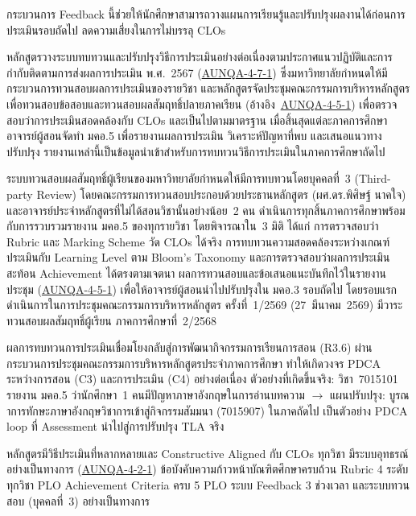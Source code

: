 กระบวนการ Feedback นี้ช่วยให้นักศึกษาสามารถวางแผนการเรียนรู้และปรับปรุงผลงานได้ก่อนการประเมินรอบถัดไป ลดความเสี่ยงในการไม่บรรลุ CLOs


หลักสูตรวางระบบทบทวนและปรับปรุงวิธีการประเมินอย่างต่อเนื่องตามประกาศแนวปฏิบัติและการกำกับติดตามการส่งผลการประเมิน พ.ศ.~2567 (\hyperlink{ref:AUNQA-4-7-1}{AUNQA-4-7-1}) ซึ่งมหาวิทยาลัยกำหนดให้มีกระบวนการทวนสอบผลการประเมินของรายวิชา และหลักสูตรจัดประชุมคณะกรรมการบริหารหลักสูตรเพื่อทวนสอบข้อสอบและทวนสอบผลสัมฤทธิ์ปลายภาคเรียน (อ้างอิง~\hyperlink{ref:AUNQA-4-5-1}{AUNQA-4-5-1}) เพื่อตรวจสอบว่าการประเมินสอดคล้องกับ CLOs และเป็นไปตามมาตรฐาน เมื่อสิ้นสุดแต่ละภาคการศึกษา อาจารย์ผู้สอนจัดทำ มคอ.5 เพื่อรายงานผลการประเมิน วิเคราะห์ปัญหาที่พบ และเสนอแนวทางปรับปรุง รายงานเหล่านี้เป็นข้อมูลนำเข้าสำหรับการทบทวนวิธีการประเมินในภาคการศึกษาถัดไป

ระบบทวนสอบผลสัมฤทธิ์ผู้เรียนของมหาวิทยาลัยกำหนดให้มีการทบทวนโดยบุคคลที่~3 (Third-party Review) โดยคณะกรรมการทวนสอบประกอบด้วยประธานหลักสูตร (ผศ.ดร.พิศิษฐ์ นาคใจ) และอาจารย์ประจำหลักสูตรที่ไม่ได้สอนวิชานั้นอย่างน้อย~2 คน ดำเนินการทุกสิ้นภาคการศึกษาพร้อมกับการรวบรวมรายงาน มคอ.5 ของทุกรายวิชา โดยพิจารณาใน~3 มิติ ได้แก่ การตรวจสอบว่า Rubric และ Marking Scheme วัด CLOs ได้จริง การทบทวนความสอดคล้องระหว่างเกณฑ์ประเมินกับ Learning Level ตาม Bloom's Taxonomy และการตรวจสอบว่าผลการประเมินสะท้อน Achievement ได้ตรงตามเจตนา ผลการทวนสอบและข้อเสนอแนะบันทึกไว้ในรายงานประชุม (\hyperlink{ref:AUNQA-4-5-1}{AUNQA-4-5-1}) เพื่อให้อาจารย์ผู้สอนนำไปปรับปรุงใน มคอ.3 รอบถัดไป โดยรอบแรกดำเนินการในการประชุมคณะกรรมการบริหารหลักสูตร ครั้งที่~1/2569 (27~มีนาคม~2569) มีวาระทวนสอบผลสัมฤทธิ์ผู้เรียน ภาคการศึกษาที่~2/2568

ผลการทบทวนการประเมินเชื่อมโยงกลับสู่การพัฒนากิจกรรมการเรียนการสอน (R3.6) ผ่านกระบวนการประชุมคณะกรรมการบริหารหลักสูตรประจำภาคการศึกษา ทำให้เกิดวงจร PDCA ระหว่างการสอน (C3) และการประเมิน (C4) อย่างต่อเนื่อง ตัวอย่างที่เกิดขึ้นจริง: วิชา~7015101 รายงาน มคอ.5 ว่านักศึกษา~1 คนมีปัญหาภาษาอังกฤษในการอ่านบทความ $\rightarrow$ แผนปรับปรุง: บูรณาการทักษะภาษาอังกฤษวิชาการเข้าสู่กิจกรรมสัมมนา (7015907) ในภาคถัดไป เป็นตัวอย่าง PDCA loop ที่ Assessment นำไปสู่การปรับปรุง TLA จริง

\begin{strengthbox}
หลักสูตรมีวิธีประเมินที่หลากหลายและ Constructive Aligned กับ CLOs ทุกวิชา มีระบบอุทธรณ์อย่างเป็นทางการ (\hyperlink{ref:AUNQA-4-2-1}{AUNQA-4-2-1}) ข้อบังคับความก้าวหน้าบัณฑิตศึกษาครบถ้วน Rubric 4 ระดับทุกวิชา PLO Achievement Criteria ครบ 5 PLO ระบบ Feedback 3 ช่วงเวลา และระบบทวนสอบ (บุคคลที่~3) อย่างเป็นทางการ
\end{strengthbox}

